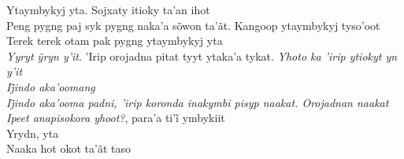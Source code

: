 \begin{linenumbers}\begingroup\raggedright

\noindent   Ytaymbykyj yta. Sojxaty itioky ta'an ihot\\
  Peng pygng paj syk pygng naka'a sõwon ta'ãt. Kangoop ytaymbykyj tyso'oot\\
  Terek terek otam pak pygng ytaymbykyj yta\\
  \emph{Yyryt ỹryn y’it}. ’Irip orojadna pitat tyyt ytaka’a tykat. \emph{Yhoto ka ’irip ytiokyt yn y’it}\\
  \emph{Ij̃indo aka’oomang}\\
  \emph{Ij̃indo aka’ooma padni, ’irip koronda inakymbi pisyp naakat. Orojadnan naakat}\\
  \emph{Ipeet anapisokora yhoot?}, para’a ti’ĩ ymbykiit\\
  Yrydn, yta\\
  Naaka hot okot ta'ãt taso

\end{linenumbers}\endgroup

\bigskip

